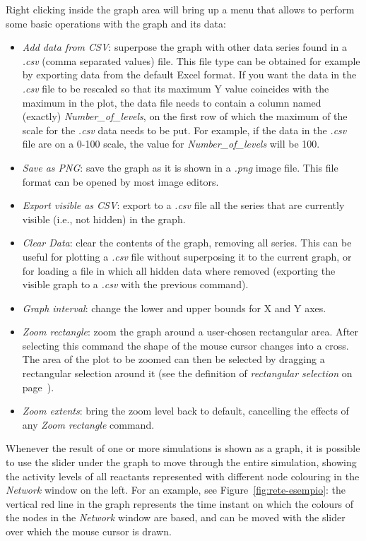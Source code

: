 Right clicking inside the graph area will bring up a menu that allows to perform some basic operations with the graph
and its data:
\begin{itemize}
  \item \emph{Add data from CSV}: superpose the graph with other data series found in a \emph{.csv} (comma separated values) file. This file type can be
obtained for example by exporting data from the default Excel format. If you want the data in the \emph{.csv} file to be rescaled so
that its maximum Y value coincides with the maximum in the plot, the data file needs to contain a column named (exactly)
\emph{Number\_{}of\_{}levels}, on the first row of which the maximum of the scale for the \emph{.csv} data needs to be put. For example,
if the data in the \emph{.csv} file are on a 0-100 scale, the value for \emph{Number\_{}of\_{}levels} will be 100.
  \item \emph{Save as PNG}: save the graph as it is shown in a \emph{.png} image file. This file format can be opened by most
image editors.
  \item \emph{Export visible as CSV}: export to a \emph{.csv} file all the series that are currently visible (i.e., not hidden)
in the graph.
  \item \emph{Clear Data}: clear the contents of the graph, removing all series. This can be useful for plotting
a \emph{.csv} file without superposing it to the current graph, or for loading a file in which all hidden data where removed
(exporting the visible graph to a \emph{.csv} with the previous command).
  \item \emph{Graph interval}: change the lower and upper bounds for X and Y axes.
  \item \emph{Zoom rectangle}: zoom the graph around a user-chosen rectangular area.
    After selecting this command the shape of the mouse cursor changes into a cross. The area of the plot to be
    zoomed can then be selected by dragging a rectangular selection around it (see the definition of \emph{rectangular
    selection} on page~\pageref{nota:rectangular-selection}).
  \item \emph{Zoom extents}: bring the zoom level back to default, cancelling the effects of any \emph{Zoom rectangle}
command.
\end{itemize}

Whenever the result of one or more simulations is shown as a graph, it is possible to use the slider under the graph to
move through the entire simulation, showing the activity levels of all reactants represented with different node colouring in
the \emph{Network} window on the left. For an example, see Figure~\ref{fig:rete-esempio}: the vertical red line in the
graph represents the time instant on which the colours of the nodes in the \emph{Network} window are based, and can
be moved with the slider over which the mouse cursor is drawn.




